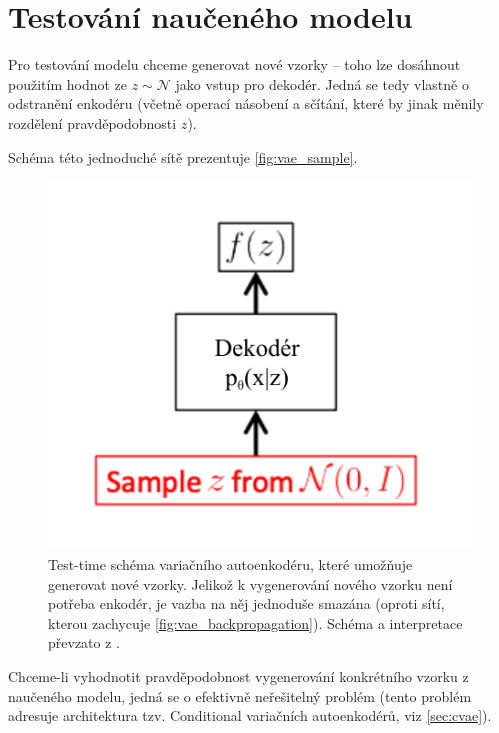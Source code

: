\section{Testování naučeného modelu}
Pro testování modelu chceme generovat nové vzorky – toho lze dosáhnout použitím hodnot ze $z \sim \mathcal{N}$ jako vstup pro dekodér.
Jedná se tedy vlastně o odstranění enkodéru (včetně operací násobení a sčítání, které by jinak měnily rozdělení pravděpodobnosti $z$). \cite{Doersch2021}

Schéma této jednoduché sítě prezentuje \autoref{fig:vae_sample}.

\begin{figure}[H]
    \centering
    \includegraphics{figures/vae_sample.pdf}
    \caption{Test-time schéma variačního autoenkodéru, které umožňuje generovat nové vzorky. Jelikož k vygenerování nového vzorku není potřeba enkodér, je vazba na něj jednoduše smazána (oproti sítí, kterou zachycuje \autoref{fig:vae_backpropagation}). Schéma a interpretace převzato z \cite{Doersch2021}.}
    \label{fig:vae_sample}
\end{figure}

Chceme-li vyhodnotit pravděpodobnost vygenerování konkrétního vzorku z naučeného modelu, jedná se o efektivně neřešitelný problém (tento problém adresuje architektura tzv. Conditional variačních autoenkodérů, viz \autoref{sec:cvae}).